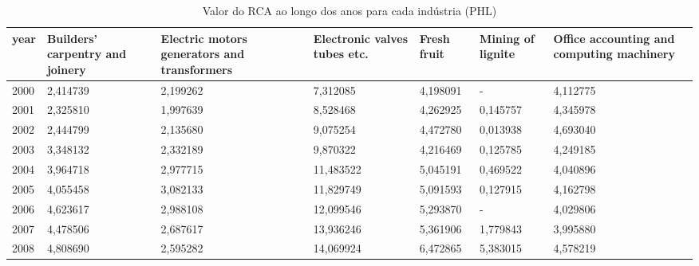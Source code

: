 \begin{table}
\centering
\caption{Valor do RCA ao longo dos anos para cada indústria (PHL)}
\begin{tabular}{p{1cm}p{2cm}p{2cm}p{2cm}p{2cm}p{2cm}p{2cm}}
\toprule
 year &  Builders' carpentry and joinery &  Electric motors generators and transformers &  Electronic valves tubes etc. &  Fresh fruit &  Mining of lignite &  Office accounting and computing machinery \\
\midrule
 2000 &                         2,414739 &                                     2,199262 &                      7,312085 &     4,198091 &                  - &                                   4,112775 \\
 2001 &                         2,325810 &                                     1,997639 &                      8,528468 &     4,262925 &           0,145757 &                                   4,345978 \\
 2002 &                         2,444799 &                                     2,135680 &                      9,075254 &     4,472780 &           0,013938 &                                   4,693040 \\
 2003 &                         3,348132 &                                     2,332189 &                      9,870322 &     4,216469 &           0,125785 &                                   4,249185 \\
 2004 &                         3,964718 &                                     2,977715 &                     11,483522 &     5,045191 &           0,469522 &                                   4,040896 \\
 2005 &                         4,055458 &                                     3,082133 &                     11,829749 &     5,091593 &           0,127915 &                                   4,162798 \\
 2006 &                         4,623617 &                                     2,988108 &                     12,099546 &     5,293870 &                  - &                                   4,029806 \\
 2007 &                         4,478506 &                                     2,687617 &                     13,936246 &     5,361906 &           1,779843 &                                   3,995880 \\
 2008 &                         4,808690 &                                     2,595282 &                     14,069924 &     6,472865 &           5,383015 &                                   4,578219 \\

\end{tabular}
\end{table}
